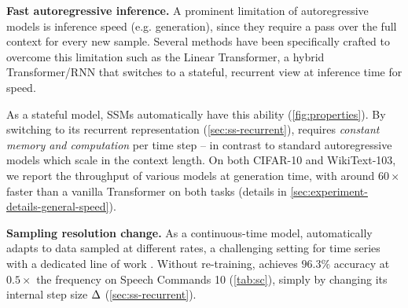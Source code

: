 \textbf{Fast autoregressive inference.}
A prominent limitation of autoregressive models is inference speed (e.g. generation),
since they require a pass over the full context for every new sample.
Several methods have been specifically crafted to overcome this limitation such as the Linear Transformer, a hybrid Transformer/RNN that switches to a stateful, recurrent view at inference time for speed.

As a stateful model, SSMs automatically have this ability (\cref{fig:properties}).
By switching to its recurrent representation (\cref{sec:ss-recurrent}),
\methodabbrv{} requires \emph{constant memory and computation} per time step -- in contrast to standard autoregressive models which scale in the context length.
On both CIFAR-10 and WikiText-103,
we report the throughput of various models at generation time, with \methodabbrv{} around $60\times$ faster than a vanilla Transformer on both tasks (details in \cref{sec:experiment-details-general-speed}).


\textbf{Sampling resolution change.}
As a continuous-time model, \methodabbrv{} automatically adapts to data sampled at different rates,
a challenging setting for time series with a dedicated line of work \citep{rubanova2019latent,de2019gru,romero2021ckconv}.
Without re-training, \methodabbrv{} achieves $96.3\%$ accuracy at $0.5\times$ the frequency on Speech Commands 10 (\cref{tab:sc}), simply by changing its internal step size \( \Delta \) (\cref{sec:ss-recurrent}).


